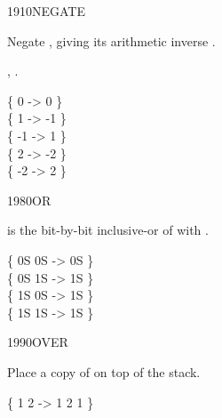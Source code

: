 \begin{worddef}{1910}{NEGATE}
\item {}

	Negate , giving its arithmetic inverse .

\see {},
	.


	\begin{defer}
	\testing
		\{  0  ->  0 \} \\
		\{  1  -> -1 \} \\
		\{ -1  ->  1 \} \\
		\{  2  -> -2 \} \\
		\{ -2  ->  2 \}
	\end{defer}
\end{worddef}


\begin{worddef}{1980}{OR}
\item {}

	 is the bit-by-bit inclusive-or of  with
	\param{x_2}.

	\begin{defer}
	\testing
		\{ 0S 0S  -> 0S \} \\
		\{ 0S 1S  -> 1S \} \\
		\{ 1S 0S  -> 1S \} \\
		\{ 1S 1S  -> 1S \}
	\end{defer}
\end{worddef}


\begin{worddef}{1990}{OVER}
\item {}

	Place a copy of  on top of the stack.

	\begin{defer}
	\testing
		\{ 1 2  -> 1 2 1 \}
	\end{defer}
\end{worddef}


